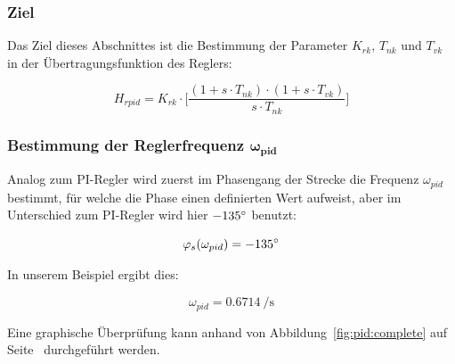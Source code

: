 \subsubsection*{Ziel}
Das  Ziel  dieses  Abschnittes  ist die  Bestimmung  der  Parameter  $K_{rk}$,
$T_{nk}$ und $T_{vk}$ in der \"Ubertragungsfunktion des Reglers:

\begin{equation} \label{eq:pid:target}
    H_{rpid} = K_{rk} \cdot \biggl[ \frac{(1 + s \cdot T_{nk}) \cdot (1 + s \cdot T_{vk}) }{ s \cdot T_{nk} } \biggr]
\end{equation}


\subsubsection{Bestimmung der Reglerfrequenz $\mathbf{\boldsymbol{\omega}_{pid}}$}

Analog  zum PI-Regler  wird  zuerst  im Phasengang  der  Strecke die  Frequenz
$\omega_{pid}$  bestimmt,  f\"ur  welche  die  Phase  einen  definierten  Wert
aufweist,  aber   im  Unterschied   zum  PI-Regler  wird   hier  $-135\degree$
benutzt\footnotemark[7]:

\begin{equation} \label{eq:pid:phi_s}
    \varphi_s(\omega_{pid}) = -135 \degree
\end{equation}


In unserem Beispiel ergibt dies:

\begin{equation} \label{eq:pid:omega_pid}
    \omega_{pid} = \SI{0.6714}{\per\second}
\end{equation}

Eine       graphische       \"Uberpr\"ufung        kann       anhand       von
Abbildung~\ref{fig:pid:complete}      auf     Seite~\pageref{fig:pid:complete}
durchgef\"uhrt werden.



